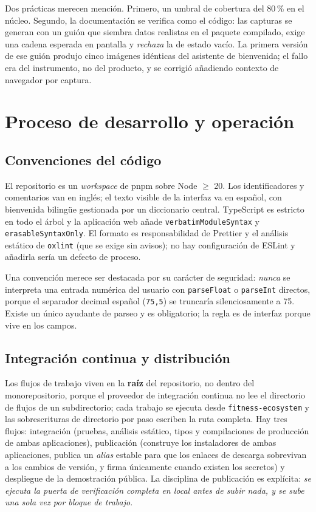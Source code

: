 \documentclass[conference]{IEEEtran}
\newcommand{\code}[1]{\texttt{\small #1}}
\begin{document}
Dos pr\'acticas merecen menci\'on. Primero, un umbral de cobertura del 80\,\% en
el n\'ucleo. Segundo, la documentaci\'on se verifica como el c\'odigo: las
capturas se generan con un gui\'on que siembra datos realistas en el paquete
compilado, exige una cadena esperada en pantalla y \emph{rechaza} la de estado
vac\'io. La primera versi\'on de ese gui\'on produjo cinco im\'agenes
id\'enticas del asistente de bienvenida; el fallo era del instrumento, no del
producto, y se corrigi\'o a\~nadiendo contexto de navegador por captura.

\section{Proceso de desarrollo y operaci\'on}

\subsection{Convenciones del c\'odigo}
El repositorio es un \emph{workspace} de pnpm sobre Node $\geq$ 20. Los
identificadores y comentarios van en ingl\'es; el texto visible de la interfaz va
en espa\~nol, con bienvenida biling\"ue gestionada por un diccionario central.
TypeScript es estricto en todo el \'arbol y la aplicaci\'on web a\~nade
\code{verbatimModuleSyntax} y \code{erasableSyntaxOnly}. El formato es
responsabilidad de Prettier y el an\'alisis est\'atico de \code{oxlint} (que se
exige sin avisos); no hay configuraci\'on de ESLint y a\~nadirla ser\'ia un
defecto de proceso.

Una convenci\'on merece ser destacada por su car\'acter de seguridad: \emph{nunca}
se interpreta una entrada num\'erica del usuario con \code{parseFloat} o
\code{parseInt} directos, porque el separador decimal espa\~nol (\code{75,5})
se truncar\'ia silenciosamente a 75. Existe un \'unico ayudante de parseo y es
obligatorio; la regla es de interfaz porque vive en los campos.

\subsection{Integraci\'on continua y distribuci\'on}
Los flujos de trabajo viven en la \textbf{ra\'iz} del repositorio, no dentro del
monorepositorio, porque el proveedor de integraci\'on continua no lee el
directorio de flujos de un subdirectorio; cada trabajo se ejecuta desde
\code{fitness-ecosystem} y las sobrescrituras de directorio por paso escriben la
ruta completa. Hay tres flujos: integraci\'on (pruebas, an\'alisis est\'atico,
tipos y compilaciones de producci\'on de ambas aplicaciones), publicaci\'on
(construye los instaladores de ambas aplicaciones, publica un \emph{alias}
estable para que los enlaces de descarga sobrevivan a los cambios de versi\'on, y
firma \'unicamente cuando existen los secretos) y despliegue de la demostraci\'on
p\'ublica. La disciplina de publicaci\'on es expl\'icita: \emph{se ejecuta la
puerta de verificaci\'on completa en local antes de subir nada, y se sube una sola
vez por bloque de trabajo}.
\end{document}
